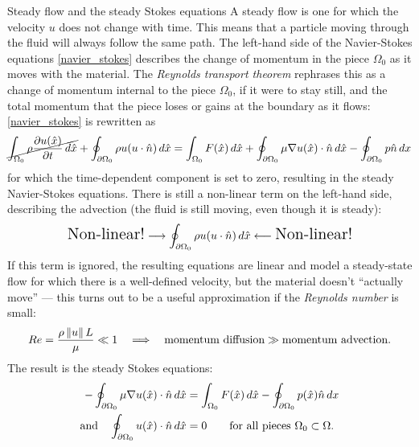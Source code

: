 \documentclass{article}
\begin{document}
\newpage
\vskip 0.2in
{\large Steady flow and the steady Stokes equations}
\vskip 0.2in
A steady flow is one for which the velocity $u$ does not change with time. This means that
a particle moving through the fluid will always follow the same path.
The left-hand side of the Navier-Stokes equations \eqref{navier_stokes} describes the change of momentum in the piece $\Omega_0$ as it moves
with the material. The \textit{Reynolds transport theorem} rephrases this as a change of momentum internal to the piece $\Omega_0$,
if it were to stay still, and the total momentum that the piece loses or gains at the boundary as it flows: \eqref{navier_stokes}
is rewritten as
\begin{equation*}
\cancel{\int_{\Omega_0} \rho \frac{\partial u(\hat{x})}{\partial t}\,d\hat{x}}
+ \oint_{\partial \Omega_0}\rho u(u\cdot \hat{n})\,d\hat{x}
      = \int_{\Omega_0}F(\hat{x})\,d\hat{x} + \oint_{\partial \Omega_0} \mu\nabla u(\hat{x})\cdot \hat{n}\,d\hat{x}
            -\oint_{\partial\Omega_0} p\hat{n}\,dx\\
\end{equation*}
for which the time-dependent component is set to zero, resulting in the steady Navier-Stokes equations. There is still a non-linear term on
the left-hand side, describing the advection (the fluid is still moving, even though it is steady):
$$
\text{\Large Non-linear!}\longrightarrow
\oint_{\partial\Omega_0}\rho u(u\cdot \hat{n})\,d\hat{x} \longleftarrow \text{\Large Non-linear!}
$$
If this term is ignored, the resulting equations are linear and model a steady-state flow for which there is a well-defined velocity,
but the material doesn't ``actually move'' --- this turns out to be a useful approximation if the \textit{Reynolds number} is small:
    {\large $$Re = \frac{\rho \left\Vert u\right\Vert L}{\mu} \ll 1 \quad\Longrightarrow\quad \text{momentum diffusion} \gg \text{momentum advection}.$$}
The result is the steady Stokes equations:
\begin{equation}\label{steady_stokes}
\begin{split}
        -\oint_{\partial \Omega_0} \mu\nabla u(\hat{x})\cdot \hat{n}\,d\hat{x}
            &= \int_{\Omega_0}F(\hat{x})\,d\hat{x}
            -\oint_{\partial\Omega_0} p(\hat{x})\hat{n}\,dx\\
    \text{and\quad} \oint_{\partial\Omega_0}u(\hat{x})\cdot\hat{n}\,d\hat{x} &= 0 \text{\quad\quad for all pieces $\Omega_0 \subset \Omega$}.
\end{split}
\end{equation}
\end{document}
